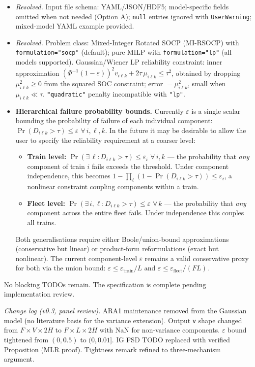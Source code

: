 \documentclass[11pt,a4paper]{article}
\begin{document}
\begin{itemize}[leftmargin=1.5em]
  \item[\checkmark] \textit{Resolved.} Input file schema: YAML/JSON/HDF5;
        model-specific fields omitted when not needed (Option A);
        \texttt{null} entries ignored with \texttt{UserWarning};
        mixed-model YAML example provided.
  \item[\checkmark] \textit{Resolved.} Problem class: Mixed-Integer Rotated SOCP
        (MI-RSOCP) with \texttt{formulation="socp"} (default); pure MILP with
        \texttt{formulation="lp"} (all models supported). Gaussian/Wiener LP
        reliability constraint: inner approximation
        $(\Phi^{-1}(1-\varepsilon))^2 v_{i\ell k} + 2\tau\,\mu_{i\ell k} \leq \tau^2$,
        obtained by dropping $\mu_{i\ell k}^2 \geq 0$ from the squared SOC constraint;
        error $= \mu_{i\ell k}^2$, small when $\mu_{i\ell k} \ll \tau$.
        \texttt{"quadratic"} penalty incompatible with \texttt{"lp"}.
  \item[\textbf{FUTURE}] \textbf{Hierarchical failure probability bounds.}
        Currently $\varepsilon$ is a single scalar bounding the probability of failure
        of each individual component: $\Pr(D_{i\ell k} > \tau) \leq \varepsilon$
        $\forall\,i,\ell,k$. In the future it may be desirable to allow the user to
        specify the reliability requirement at a coarser level:
        \begin{itemize}
          \item \textbf{Train level:} $\Pr(\exists\,\ell : D_{i\ell k} > \tau) \leq \varepsilon_i$
                $\forall\,i,k$ --- the probability that \emph{any} component of train $i$
                fails exceeds the threshold. Under component independence, this becomes
                $1 - \prod_\ell (1 - \Pr(D_{i\ell k} > \tau)) \leq \varepsilon_i$,
                a nonlinear constraint coupling components within a train.
          \item \textbf{Fleet level:} $\Pr(\exists\,i,\ell : D_{i\ell k} > \tau) \leq \varepsilon$
                $\forall\,k$ --- the probability that \emph{any} component across the
                entire fleet fails. Under independence this couples all trains.
        \end{itemize}
        Both generalisations require either Boole/union-bound approximations
        (conservative but linear) or product-form reformulations (exact but nonlinear).
        The current component-level $\varepsilon$ remains a valid conservative proxy
        for both via the union bound: $\varepsilon \leq \varepsilon_{\mathrm{train}} / L$
        and $\varepsilon \leq \varepsilon_{\mathrm{fleet}} / (FL)$.
\end{itemize}

No blocking TODOs remain. The specification is complete pending implementation review.

\emph{Change log (v0.3, panel review).}
ARA1 maintenance removed from the Gaussian model (no literature basis for the
variance extension). Output \texttt{v} shape changed from $F \times V \times 2H$
to $F \times L \times 2H$ with NaN for non-variance components.
$\varepsilon$ bound tightened from $(0, 0.5)$ to $(0, 0.01]$.
IG FSD TODO replaced with verified Proposition (MLR proof).
Tightness remark refined to three-mechanism argument.
\end{document}
